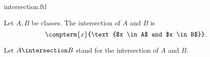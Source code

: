 \documentclass{article}
\begin{document}
\begin{smodule}[creators={Marcel Schütz}]{intersection.ftl}


  \begin{fdefinition*}[label=5744033011859456]
    Let $A, B$ be classes.
    The intersection of $A$ and $B$ is
    \[\compterm{x}{\text{$x \in A$ and $x \in B$}}.\]
  \end{fdefinition*}

  \begin{fconvention*}
    Let $A \intersection B$ stand for the intersection of $A$ and $B$.
  \end{fconvention*}
\end{smodule}
\end{document}
